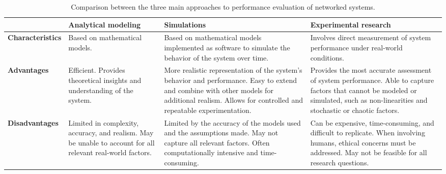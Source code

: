 \begin{table}[]
    \centering
    \caption{Comparison between the three main approaches to performance evaluation of networked systems.}\label{tab:performance-evaluation}
    \tiny
    \renewcommand{\arraystretch}{1.5}
    \begin{tabularx}{\textwidth}{@{}lXXX@{}}
        \toprule
        & \textbf{Analytical modeling} & \textbf{Simulations} & \textbf{Experimental research} \\
        \midrule

        \textbf{Characteristics} &
        Based on mathematical models. &
        Based on mathematical models implemented as software to simulate the behavior of the system over time. &
        Involves direct measurement of system performance under real-world conditions. \\

        \textbf{Advantages} &
        Efficient. Provides theoretical insights and understanding of the system. &
        More realistic representation of the system's behavior and performance.
        Easy to extend and combine with other models for additional realism.
        Allows for controlled and repeatable experimentation. &
        Provides the most accurate assessment of system performance.
        Able to capture factors that cannot be modeled or simulated, such as non-linearities and stochastic or chaotic factors. \\
            
        \textbf{Disadvantages} &
        Limited in complexity, accuracy, and realism.
        May be unable to account for all relevant real-world factors. &
        Limited by the accuracy of the models used and the assumptions made.
        May not capture all relevant factors.
        Often computationally intensive and time-consuming. &
        Can be expensive, time-consuming, and difficult to replicate.
        When involving humans, ethical concerns must be addressed.
        May not be feasible for all research questions. \\
        
        \bottomrule
    \end{tabularx}
\end{table}
